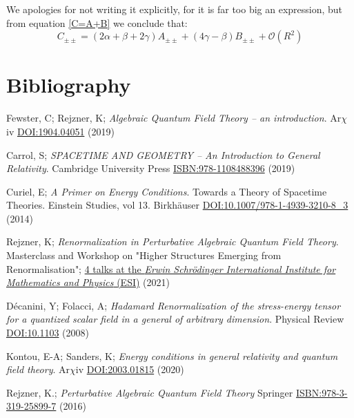\documentclass[a4paper,11pt]{article}
\numberwithin{equation}{section}
\theoremstyle{definition}
\begin{document}
We apologies for not writing it explicitly, for it is far too big an expression, but from equation \ref{C=A+B} we conclude that:
\begin{equation}
    \boxed{C_{\pm\pm} = (2\alpha + \beta + 2\gamma) A_{\pm\pm} +(4\gamma- \beta)B_{\pm\pm} + \mathcal{O}(R^2)}
\end{equation}


\newpage 
\color{white}\section{Bibliography}\color{black}
\begin{thebibliography}{99}

    Fewster, C; Rejzner, K; \textit{Algebraic Quantum Field Theory -- an introduction}. Ar$\chi$iv \href{https://arxiv.org/abs/1904.04051}{DOI:1904.04051} (2019)

    Carrol, S; \textit{SPACETIME AND GEOMETRY -- An Introduction to General Relativity}. Cambridge University Press \href{https://www.cambridge.org/highereducation/books/spacetime-and-geometry/38EDABF9E2BADCE6FBCF2B22DC12BFFE#overview}{ISBN:978-1108488396} (2019)

    Curiel, E; \textit{A Primer on Energy Conditions}. Towards a Theory of Spacetime Theories. Einstein Studies, vol 13. Birkhäuser \href{https://arxiv.org/abs/1405.0403}{DOI:10.1007/978-1-4939-3210-8\_3} (2014)

    Rejzner, K; \textit{Renormalization in Perturbative Algebraic Quantum Field Theory}. Masterclass and Workshop on "Higher Structures Emerging from Renormalisation"; \href{https://www.youtube.com/watch?v=3JVDJhFpuPY&ab_channel=ErwinSchr%C3%B6dingerInternationalInstituteforMathematicsandPhysics%28ESI%29}{4 talks at the \textit{Erwin Schrödinger International Institute for Mathematics and Physics} (ESI)} (2021)

    Décanini, Y; Folacci, A; \textit{Hadamard Renormalization of the stress-energy tensor for a quantized scalar field in a general of arbitrary dimension}. Physical Review \href{https://arxiv.org/abs/gr-qc/0512118}{DOI:10.1103} (2008)

     Kontou, E-A; Sanders, K; \textit{Energy conditions in general relativity and quantum field theory}. Ar$\chi$iv \href{https://arxiv.org/abs/2003.01815}{DOI:2003.01815} (2020)

    Rejzner, K.; \textit{Perturbative Algebraic Quantum Field Theory} Springer \href{https://link.springer.com/book/10.1007/978-3-319-25901-7}{ISBN:978-3-319-25899-7} (2016)


\end{thebibliography}
\end{document}
